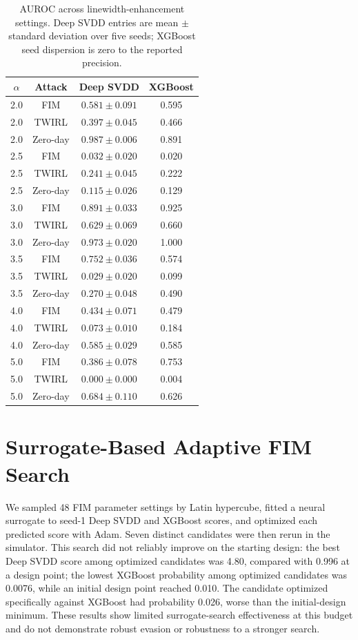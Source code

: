 \documentclass[12pt, a4paper]{report}
\begin{document}
\begin{table}[ht]
\centering
\caption{AUROC across linewidth-enhancement settings. Deep SVDD entries are mean $\pm$ standard deviation over five seeds; XGBoost seed dispersion is zero to the reported precision.}
\label{tab:alpha}
\small
\begin{tabular}{cccc}
\toprule
$\alpha$ & Attack & Deep SVDD & XGBoost \\
\midrule
2.0 & FIM & $0.581\pm0.091$ & 0.595 \\
2.0 & TWIRL & $0.397\pm0.045$ & 0.466 \\
2.0 & Zero-day & $0.987\pm0.006$ & 0.891 \\
2.5 & FIM & $0.032\pm0.020$ & 0.020 \\
2.5 & TWIRL & $0.241\pm0.045$ & 0.222 \\
2.5 & Zero-day & $0.115\pm0.026$ & 0.129 \\
3.0 & FIM & $0.891\pm0.033$ & 0.925 \\
3.0 & TWIRL & $0.629\pm0.069$ & 0.660 \\
3.0 & Zero-day & $0.973\pm0.020$ & 1.000 \\
3.5 & FIM & $0.752\pm0.036$ & 0.574 \\
3.5 & TWIRL & $0.029\pm0.020$ & 0.099 \\
3.5 & Zero-day & $0.270\pm0.048$ & 0.490 \\
4.0 & FIM & $0.434\pm0.071$ & 0.479 \\
4.0 & TWIRL & $0.073\pm0.010$ & 0.184 \\
4.0 & Zero-day & $0.585\pm0.029$ & 0.585 \\
5.0 & FIM & $0.386\pm0.078$ & 0.753 \\
5.0 & TWIRL & $0.000\pm0.000$ & 0.004 \\
5.0 & Zero-day & $0.684\pm0.110$ & 0.626 \\
\bottomrule
\end{tabular}
\end{table}

\chapter{Surrogate-Based Adaptive FIM Search}
We sampled 48 FIM parameter settings by Latin hypercube, fitted a neural surrogate to seed-1 Deep SVDD and XGBoost scores, and optimized each predicted score with Adam. Seven distinct candidates were then rerun in the simulator. This search did not reliably improve on the starting design: the best Deep SVDD score among optimized candidates was 4.80, compared with 0.996 at a design point; the lowest XGBoost probability among optimized candidates was 0.0076, while an initial design point reached 0.010. The candidate optimized specifically against XGBoost had probability 0.026, worse than the initial-design minimum. These results show limited surrogate-search effectiveness at this budget and do not demonstrate robust evasion or robustness to a stronger search.
\end{document}
